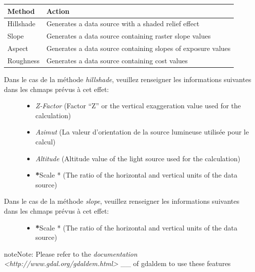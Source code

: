 \documentclass[letterpaper,10pt,english]{sphinxmanual}
\begin{document}
\begin{tabulary}{\linewidth}{|L|L|}
\hline

\textbf{Method}
 & 
\textbf{Action}
\\
\hline
Hillshade
 & 
Generates a data source with a shaded relief effect
\\
\hline
Slope
 & 
Generates a data source containing raster slope values
\\
\hline
Aspect
 & 
Generates a data source containing slopes of exposure values
\\
\hline
Roughness
 & 
Generates a data source containing cost values
\\
\hline\end{tabulary}

\begin{description}
\item[{Dans le cas de la méthode \emph{hillshade}, veuillez renseigner les informations suivantes dans les chmaps prévus à cet effet:}] \leavevmode\begin{itemize}
\item {} 
\emph{Z-Factor}  (Factor ``Z'' or the vertical exaggeration value used for the calculation)

\item {} 
\emph{Azimut} (La valeur d'orientation de la source lumineuse utilisée pour le calcul)

\item {} 
\emph{Altitude}  (Altitude value of the light source used for the calculation)

\item {} 
{\color{red}\bfseries{}*}Scale * (The ratio of the horizontal and vertical units of the data source)

\end{itemize}

\item[{Dans le cas de la méthode \emph{slope}, veuillez renseigner les informations suivantes dans les chmaps prévus à cet effet:}] \leavevmode\begin{itemize}
\item {} 
{\color{red}\bfseries{}*}Scale * (The ratio of the horizontal and vertical units of the data source)

\end{itemize}

\end{description}

\begin{notice}{note}{Note:}
Please refer to the \emph{documentation \textless{}http://www.gdal.org/gdaldem.html\textgreater{}} \_\_ of gdaldem to use these features
\end{notice}
\end{document}
